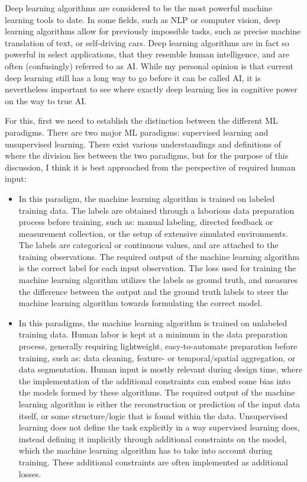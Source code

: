 			Deep learning algorithms are considered to be the most powerful machine learning tools to date.
			In some fields, such as \ac{NLP} or computer vision, deep learning algorithms allow for previously impossible tasks, such as precise machine translation of text, or self-driving cars.
			Deep learning algorithms are in fact so powerful in select applications, that they resemble human intelligence, and are often (confusingly) referred to as \ac{AI}.
			While my personal opinion is that current deep learning still has a long way to go before it can be called \ac{AI}, it is nevertheless important to see where exactly deep learning lies in cognitive power on the way to true \ac{AI}.
			
			For this, first we need to establish the distinction between the different \ac{ML} paradigms.			
			There are two major \ac{ML} paradigms: supervised learning and unsupervised learning.
			There exist various understandings and definitions of where the division lies between the two paradigms, but for the purpose of this discussion, I think it is best approached from the perspective of required human input:
			\begin{itemize}
				\item {}
					In this paradigm, the machine learning algorithm is trained on labeled training data.
					The labels are obtained through a laborious data preparation process before training, such as: manual labeling, directed feedback or measurement collection, or the setup of extensive simulated environments.	
					The labels are categorical or continuous values, and are attached to the training observations.
					The required output of the machine learning algorithm is the correct label for each input observation.
					The loss used for training the machine learning algorithm utilizes the labels as ground truth, and measures the difference between the output and the ground truth labels to steer the machine learning algorithm towards formulating the correct model.				
				
				\item {}
					In this paradigms, the machine learning algorithm is trained on unlabeled training data.
					Human labor is kept at a minimum in the data preparation process, generally requiring lightweight, easy-to-automate preparation before training, such as: data cleaning, feature- or temporal/spatial aggregation, or data segmentation.
					Human input is mostly relevant during design time, where the implementation of the additional constraints can embed some bias into the models formed by these algorithms.
					The required output of the machine learning algorithm is either the reconstruction or prediction of the input data itself, or some structure/logic that is found within the data.
					Unsupervised learning does not define the task explicitly in a way supervised learning does, instead defining it implicitly through additional constraints on the model, which the machine learning algorithm has to take into account during training.
					These additional constraints are often implemented as additional losses.					
	
			\end{itemize}		

